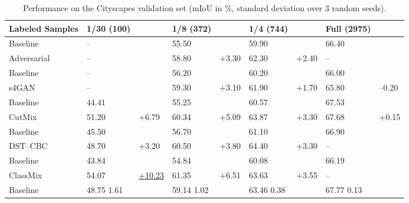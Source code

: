 \documentclass[final]{cvpr}
\newcommand*{\blarrow}{\rotatebox[origin=c]{270}{}}
\begin{document}
\begin{table*}
\caption{Performance on the Cityscapes validation set (mIoU in \%, standard deviation over 3 random seeds).}
\label{tab:comp}
\vspace{0.2cm}
\centering
\setlength{\tabcolsep}{3pt}
\begin{tabular}{|l|ll|ll|ll|ll|}
\hline
Labeled Samples & 1/30 (100)    &        & 1/8 (372)     &       & 1/4 (744)     &       & Full (2975) &       \\\hline\hline
Baseline \cite{hung2018adversarial}        & --             &        & 55.50 & \blarrow      & 59.90 & \blarrow      & 66.40     & \blarrow      \\
Adversarial \cite{hung2018adversarial}      & --       &        & 58.80 & +3.30 & 62.30 & +2.40 & --           &       \\\hline\hline
Baseline \cite{mittal2019semi}        & --             &        & 56.20 & \blarrow      & 60.20 & \blarrow      & 66.00     &      \\
s4GAN \cite{mittal2019semi}           & --       &        & 59.30 & +3.10 & 61.90 & +1.70 & 65.80     & --0.20 \\\hline\hline
Baseline \cite{french2019consistency}        & 44.41 \scriptsize{}       & \blarrow          & 55.25 \scriptsize{} & \blarrow      & 60.57 \scriptsize{} & \blarrow      & 67.53 \scriptsize{}     & \blarrow      \\
CutMix \cite{french2019consistency}         & 51.20 \scriptsize{} & +6.79  & 60.34 \scriptsize{} & +5.09 & 63.87 \scriptsize{} & +3.30 & 67.68 \scriptsize{}     & +0.15 \\\hline\hline
Baseline \cite{feng2020semi}        & 45.50       & \blarrow          & 56.70 & \blarrow      & 61.10 & \blarrow      & 66.90     &      \\
DST--CBC \cite{feng2020semi}     & 48.70   & +3.20  & 60.50 & +3.80 & 64.40 & +3.30 & --           &       \\\hline\hline
Baseline \cite{olsson2020classmix}        & 43.84 \scriptsize{}      & \blarrow       & 54.84 \scriptsize{} & \blarrow      & 60.08 \scriptsize{} & \blarrow      & 66.19 \scriptsize{}    &      \\
ClassMix \cite{olsson2020classmix}         & 54.07 \scriptsize{} & \underline{+10.23} & 61.35 \scriptsize{} & +6.51 & 63.63 \scriptsize{} & +3.55 & --           &       \\\hline\hline
Baseline & 48.75	\scriptsize{1.61} & \blarrow &	59.14	\scriptsize{1.02}	& \blarrow &	63.46	\scriptsize{0.38}	& \blarrow &	67.77	\scriptsize{0.13} & \blarrow \\

\end{tabular}
\end{table*}
\end{document}
